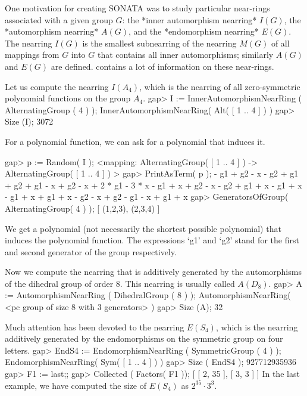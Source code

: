 %
%

One motivation for creating SONATA was to study
particular near-rings associated with a given
group $G$: the *inner automorphism nearring*
$I(G)$, the *automorphism nearring* $A(G)$, and
the *endomorphism nearring* $E(G)$. 
The nearring $I(G)$ is the smallest subnearring of the
nearring $M(G)$ of all mappings from $G$ into $G$ that
contains all inner automorphisms; similarly $A(G)$ and $E(G)$
are defined. \cite{meldrum85:NATLWG} contains 
a lot of information on these near-rings.



Let us compute the nearring $I(A_4)$, which is the nearring of all
zero-symmetric polynomial functions on the group $A_4$.
\beginexample
    gap> I := InnerAutomorphismNearRing ( AlternatingGroup ( 4 ) );
    InnerAutomorphismNearRing( Alt( [ 1 .. 4 ] ) )
    gap> Size (I);
    3072
\endexample

For a polynomial function, we can ask for a polynomial that induces it.

\beginexample
    gap> p := Random( I );
    <mapping: AlternatingGroup( [ 1 .. 4 ] ) -> AlternatingGroup( [ 1 .. 4 ] ) >
    gap> PrintAsTerm( p );
     - g1 + g2 - x - g2 + g1 + g2 + g1 - x + g2 - x + 2 * g1 - 
    3 * x - g1 + x + g2 - x - g2 + g1 + x - g1 + x - g1 + x + 
    g1 + x - g2 - x + g2 - g1 - x + g1 + x
    gap> GeneratorsOfGroup( AlternatingGroup( 4 ) );
    [ (1,2,3), (2,3,4) ]
\endexample

We get a polynomial (not necessarily the shortest possible polynomial) that induces
the polynomial function. The expressions `g1' and `g2' stand for the first and second
generator of the group respectively.

Now we compute the nearring that is additively generated by the automorphisms
of the dihedral group of order 8. This nearring is usually called
$A (D_8)$.  
\beginexample
    gap> A := AutomorphismNearRing ( DihedralGroup ( 8 ) );
    AutomorphismNearRing( <pc group of size 8 with 3 generators> )
    gap> Size (A);
    32
\endexample

Much attention has been devoted to the nearring $E (S_4)$, which
is the nearring additively generated by the endomorphisms on the
symmetric group on four letters.
\beginexample
    gap> EndS4 := EndomorphismNearRing ( SymmetricGroup ( 4 ) );
    EndomorphismNearRing( Sym( [ 1 .. 4 ] ) )
    gap> Size ( EndS4 );
    927712935936
    gap> F1 := last;;
    gap> Collected ( Factors( F1 ));
    [ [ 2, 35 ], [ 3, 3 ] ]
\endexample
In the last example, we have computed the size 
of $E (S_4)$ as $2^{35} \cdot 3^3$.

